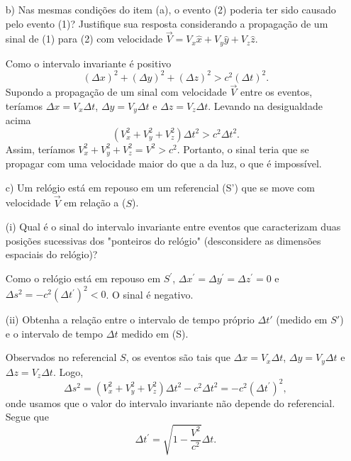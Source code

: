 \begin{enumerate}[start=1,label={\bfseries Q\arabic*.}]
b) Nas mesmas condições do item (a), o evento (2) poderia ter sido causado pelo evento (1)? Justifique sua resposta considerando a propagação de um sinal de (1) para (2) com velocidade $\vec{V} = V_{x} \hat{x} + V_{y} \hat{y} + V_{z} \hat{z}$.

\resposta Como o intervalo invariante é positivo
%
\begin{equation}
 (\Delta x)^{2} + (\Delta y)^{2} + (\Delta z)^{2} > c^{2} (\Delta t)^{2} .
\end{equation}
%
Supondo a propagação de um sinal com velocidade $\vec{V}$ entre os eventos, teríamos $\Delta x = V_{x} \Delta t$, $\Delta y = V_{y} \Delta t$ e $\Delta z = V_{z} \Delta t$. Levando na desigualdade acima
%
\begin{equation}
  ( V_{x}^{2} + V_{y}^{2} + V_{z}^{2} ) \Delta t^{2} > c^{2} \Delta t^{2} .
\end{equation}
%
Assim, teríamos $V_{x}^{2} + V_{y}^{2} + V_{z}^{2} = V^{2} > c^{2}$. Portanto, o sinal teria que se propagar com uma velocidade maior do que a da luz, o que é impossível.



c) Um relógio está em repouso em um referencial (S') que se move com velocidade $\vec{V}$ em relação a ($S$).

\item[(i)] Qual é o sinal do intervalo invariante entre eventos que caracterizam duas posições sucessivas dos "ponteiros do relógio" (desconsidere as dimensões espaciais do relógio)?

\resposta Como o relógio está em repouso em $S^{\prime}$, $\Delta x^{\prime} = \Delta y^{\prime} = \Delta z^{\prime} = 0$ e $\Delta s^{2} = - c^{2} (\Delta t^{\prime})^{2} < 0$. O sinal é negativo.

\item[(ii)] Obtenha a relação entre o intervalo de tempo próprio $\Delta t'$ (medido em $S'$) e o intervalo de tempo $\Delta t$ medido em (S).

\resposta Observados no referencial $S$, os eventos são tais que $\Delta x = V_{x} \Delta t$, $\Delta y = V_{y} \Delta t$ e $\Delta z = V_{z} \Delta t$. Logo,
%
\begin{equation}
  \Delta s^{2} = (V_{x}^{2} + V_{y}^{2} + V_{z}^{2}) \Delta t^{2} - c^{2} \Delta t^{2} = - c^{2} (\Delta t^{\prime})^{2} ,
\end{equation}
%
onde usamos que o valor do intervalo invariante não depende do referencial. Segue que
%
\begin{equation}
  \Delta t^{\prime} = \sqrt{1 - \frac{V^{2}}{c^{2}}} \Delta t .
\end{equation}
%




\end{enumerate}

